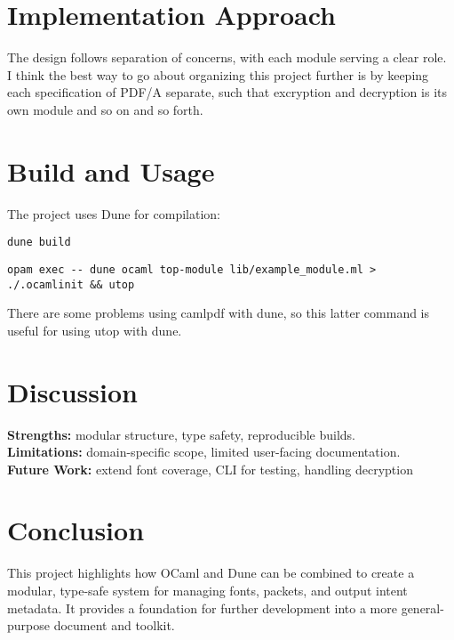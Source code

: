 \documentclass[11pt]{article}
\begin{document}
\section*{Implementation Approach}
The design follows separation of concerns, with each module serving a clear role. 
I think the best way to go about organizing this project further is by keeping each specification of PDF/A separate,
such that excryption and decryption is its own module and so on and so forth. 

\section*{Build and Usage}
The project uses Dune for compilation:
\begin{verbatim}
dune build
\end{verbatim}
\begin{verbatim}
opam exec -- dune ocaml top-module lib/example_module.ml > ./.ocamlinit && utop
\end{verbatim}
There are some problems using camlpdf with dune, so this latter command is
useful for using utop with dune.

\section*{Discussion}
\textbf{Strengths:} modular structure, type safety, reproducible builds.\\
\textbf{Limitations:} domain-specific scope, limited user-facing documentation.\\
\textbf{Future Work:} extend font coverage, CLI for testing, handling decryption

\section*{Conclusion}
This project highlights how OCaml and Dune can be combined to create a modular, type-safe system for managing fonts, packets, and output intent metadata. It provides a foundation for further development into a more general-purpose document and toolkit.
\end{document}

